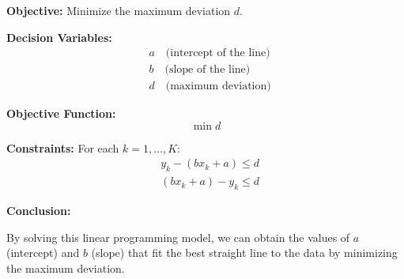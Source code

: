 \documentclass{article}
\begin{document}
\textbf{Objective:} Minimize the maximum deviation \( d \).

\textbf{Decision Variables:}
\[
\begin{aligned}
    &a \quad \text{(intercept of the line)} \\
    &b \quad \text{(slope of the line)} \\
    &d \quad \text{(maximum deviation)}
\end{aligned}
\]

\textbf{Objective Function:}
\[
\min d
\]

\textbf{Constraints:}
For each \( k = 1, \ldots, K \):
\[
\begin{aligned}
    &y_k - (bx_k + a) \leq d \\
    &(bx_k + a) - y_k \leq d
\end{aligned}
\]

\textbf{Conclusion:}

By solving this linear programming model, we can obtain the values of \( a \) (intercept) and \( b \) (slope) that fit the best straight line to the data by minimizing the maximum deviation.
\end{document}
